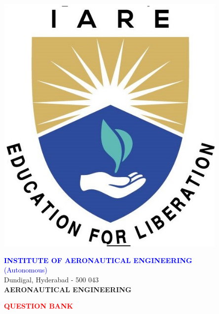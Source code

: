 \documentclass[11pt,paper=a4,answers]{exam}
\begin{document}
	\begin{minipage}{0.15\linewidth}%
		\flushleft
		\includegraphics[width=0.85\textwidth]{iare.png}\end{minipage}
	\begin{minipage}[r]{0.85\textwidth}%
		\noindent
		\begin{center}	
			\textcolor{blue}{\Large \bfseries INSTITUTE OF AERONAUTICAL ENGINEERING}\\
			\textcolor{blue}{\Large (Autonomous)} \\
			\small Dundigal, Hyderabad - 500 043 \\  [3pt] 
		
			\vspace{5pt}
			\large \bfseries AERONAUTICAL ENGINEERING \\\vspace{5pt}
			
			\textcolor{red}{\large \bfseries QUESTION BANK} \\\vspace{3pt}
		\end{center}
	\end{minipage}
	\vspace{0.5cm}
	\par
\end{document}
